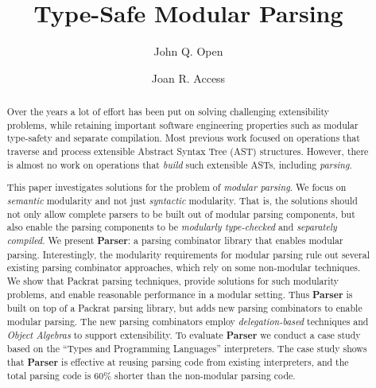 \documentclass[a4paper,UKenglish]{lipics-v2016}
\title{Type-Safe Modular Parsing}
\author[1]{John Q. Open}
\author[2]{Joan R. Access}
\affil[1]{Dummy University Computing Laboratory, Address/City, Country\\
  \texttt{open@dummyuniversity.org}}
\affil[2]{Department of Informatics, Dummy College, Address/City, Country\\
  \texttt{access@dummycollege.org}}
\newcommand\name{\textbf{Parser}\xspace}
\begin{document}
\maketitle

\begin{abstract}

  Over the years a lot of effort has been put on solving challenging
  extensibility problems, while retaining important software
  engineering properties such as modular type-safety and
  separate compilation. Most previous work focused on
  operations that traverse and process extensible Abstract Syntax Tree
  (AST) structures. However, there is almost no work on operations that
  \emph{build} such extensible ASTs, including \emph{parsing}.

  This paper investigates solutions for the problem of \emph{modular
    parsing}. We focus on \emph{semantic} modularity and not just
  \emph{syntactic} modularity. That is, the solutions should not only
  allow complete parsers to be built out of modular parsing
  components, but also enable the parsing components to be
  \emph{modularly type-checked} and \emph{separately compiled}. We
  present \name: a parsing combinator library that enables modular
  parsing. Interestingly, the modularity requirements for modular
  parsing rule out several existing parsing combinator approaches,
  which rely on some non-modular techniques. We show that Packrat
  parsing techniques, provide solutions for such modularity problems,
  and enable reasonable performance in a modular setting.  Thus \name
  is built on top of a Packrat parsing library, but adds new parsing
  combinators to enable modular parsing. The new parsing combinators
  employ \emph{delegation-based} techniques and \emph{Object Algebras}
  to support extensibility. To evaluate \name we conduct a case study
  based on the ``Types and Programming Languages'' interpreters. The
  case study shows that \name is effective at reusing parsing code
  from existing interpreters, and the total parsing code is 60\%
  shorter than the non-modular parsing code.

\end{abstract}



%
\end{document}
